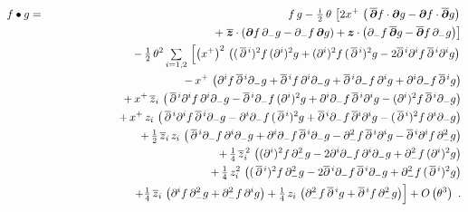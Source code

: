 \documentclass[11pt,a4paper]{article}
\newcommand{\mbf}[1]{{\boldsymbol {#1} }}
\def\ii{{\,{\rm i}\,}}
\def\mz{{\mbf z}}
\def\mdell{{\mbf\partial}}
\def\d{\partial}
\begin{document}
\begin{eqnarray}
  \label{eq:symtime:positionspace}\nonumber
  f\bullet g&=&f\,g-\mbox{$\frac{\ii}2$}\,\theta\,\left[
  2x^+\,\left(\,\overline{\mdell}f\cdot\mdell g
  - \mdell f\cdot\overline{\mdell}g\right)\right.\\\nonumber
  &&\qquad\qquad\quad\quad+\left.\overline{\mz}\cdot\left(\mdell f\,\d_- g
  - \d_- f\,\mdell g\right)+ \mz\cdot\left(\d_- f\,\overline{\mdell}g
   - \overline{\mdell}f\,\d_- g\right)\right]\\ \nonumber
  &&-\,\mbox{$\frac1{2}$}\,\theta^2\,\mbox{$\sum\limits_{i=1,2}$}\,
  \left[\left(x^+\right)^2\,\left((\,\overline{\d}{}^{\,i})^2f\,(\d^i)^2g
  +(\d^i)^2f\,(\,\overline{\d}{}^{\,i})^2g
  -2\overline{\d}{}^{\,i}\d^if\,\overline{\d}{}^{\,i}\d^ig
  \right)\right.\\ \nonumber &&\qquad\qquad\quad\quad
  -\,x^+\,\left(\d^if\,\overline{\d}{}^{\,i}\d_- g
  +\overline{\d}{}^{\,i}f\,\d^i\d_- g
  +\overline{\d}{}^{\,i}\d_- f\,\d^ig
  +\d^i\d_- f\,\overline{\d}{}^{\,i}g\right)\\ \nonumber
  &&\qquad\qquad\quad\quad
  +\,x^+\,\overline{z}_i\,\left(\,\overline{\d}{}^{\,i}\d^if\,\d^i\d_- g
  -\overline{\d}{}^{\,i}\d_- f\,(\d^i)^2g
  +\d^i\d_- f\,\overline{\d}{}^{\,i}\d^ig
  -(\d^i)^2f\,\overline{\d}{}^{\,i}\d_- g\right)
  \\ \nonumber &&\qquad\qquad\quad\quad
  +\,x^+\,z_i\,\left(\,\overline{\d}{}^{\,i}\d^if\,\overline{\d}{}^{\,i}\d_- g
  -\d^i\d_- f\,(\,\overline{\d}{}^{\,i})^2g
  +\overline{\d}{}^{\,i}\d_- f\,\overline{\d}{}^i\d^ig
  -(\,\overline{\d}{}^{\,i})^2f\,\d^i\d_- g\right)\\ \nonumber
  &&\qquad\qquad\quad\quad
  +\,\mbox{$\frac12$}\,\overline{z}_i\,z_i\,\left(\,
  \overline{\d}{}^{\,i}\d_- f\,\d^i\d_- g
  +\d^i\d_- f\,\overline{\d}{}^{\,i}\d_- g
  -\d_- ^2f\,\overline{\d}{}^{\,i}\d^ig
  -\overline{\d}{}^{\,i}\d^if\,\d_-^2g\right)
  \\ \nonumber &&\qquad\qquad\quad\quad
  +\,\mbox{$\frac14$}\,\overline{z}_i^{\,2}\,
  \left((\d^i)^2f\,\d_-^2g
  -2\d^i\d_- f\,\d^i\d_- g
  +\d_-^2f\,(\d^i)^2g\right)\\ \nonumber &&\qquad\qquad\quad\quad
  +\,\mbox{$\frac14$}\,z_i^2\,
  \left((\,\overline{\d}{}^{\,i})^2f\,\d_-^2g
  -2\overline{\d}{}^{\,i}\d_- f\,\overline{\d}{}^{\,i}\d_- g
  +\d_-^2f\,(\,\overline{\d}{}^{\,i})^2g\right)
  \\ \nonumber &&\qquad\qquad\quad\quad
  +\Bigl.\mbox{$\frac14$}\,\overline{z}_i\,\left(\d^if\,\d_-^2g
  +\d_-^2f\,\d^ig\right)
  +\mbox{$\frac14$}\,z_i\,\left(\d_-^2f\,\overline{\d}{}^{\,i}g
  +\overline{\d}{}^{\,i}f\,\d_-^2g\right)
  \Bigr]+O\left(\theta^3\right) \ . \\ &&
\end{eqnarray}
\end{document}
